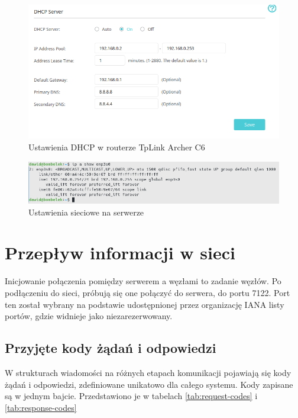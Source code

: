 \documentclass[12pt,oneside,a4paper]{book}
\theoremstyle{break}
\begin{document}
\begin{figure}
    \begin{center}
        \includegraphics[width=\textwidth]{ustawienia_dhcp.png}        
        \caption{Ustawienia DHCP w routerze TpLink Archer C6}     
        \label{rys:ustawienia-routera}   
    \end{center}
\end{figure}

\begin{figure}
    \begin{center}
        \includegraphics[width=\textwidth]{server_ustawienia_sieciowe.png}        
        \caption{Ustawienia sieciowe na serwerze}       
        \label{rys:konfig-ip-serwera} 
    \end{center}
\end{figure}

\chapter{Przepływ informacji w sieci}
Inicjowanie połączenia pomiędzy serwerem a węzłami to zadanie węzłów.
Po podłączeniu do sieci, próbują się one połączyć do serwera, do portu 7122.
Port ten został wybrany na podstawie udostępnionej przez organizację IANA
listy portów, gdzie widnieje jako niezarezerwowany.
\cite{iana-ports}

\section{Przyjęte kody żądań i odpowiedzi}
W strukturach wiadomości na różnych etapach komunikacji pojawiają się
kody żądań i odpowiedzi, zdefiniowane unikatowo dla całego systemu. 
Kody zapisane są w jednym bajcie. Przedstawiono je w tabelach 
\ref{tab:request-codes} i \ref{tab:response-codes}
\end{document}
